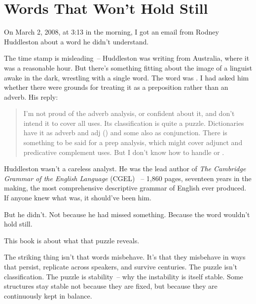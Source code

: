 % 

\chapter{Words That Won't Hold Still}
\label{ch:words-wont-hold-still}

\label{sec:1:opening}
On March 2, 2008, at 3:13 in the morning, I got an email from Rodney Huddleston about a word he didn't understand.

The time stamp is misleading~-- Huddleston was writing from Australia, where it was a reasonable hour. But there's something fitting about the image of a linguist awake in the dark, wrestling with a single word. The word was . I had asked him whether there were grounds for treating it as a preposition rather than an adverb. His reply:

\begin{quote}
I'm not proud of the adverb analysis, or confident about it, and don't intend it to cover all uses. Its classification is quite a puzzle. Dictionaries have it as adverb and adj () and some also as conjunction. There is something to be said for a prep analysis, which might cover adjunct and predicative complement uses. But I don't know how to handle  or .
\end{quote}

Huddleston wasn't a careless analyst. He was the lead author of \textit{The Cambridge Grammar of the English Language} (CGEL) \citep{huddleston2002}~-- 1,860 pages, seventeen years in the making, the most comprehensive descriptive grammar of English ever produced. If anyone knew what  was, it should've been him.

But he didn't. Not because he had missed something. Because the word wouldn't hold still.

This book is about what that puzzle reveals.

The striking thing isn't that words misbehave. It's that they misbehave in ways that persist, replicate across speakers, and survive centuries. The puzzle isn't classification. The puzzle is stability~-- why the instability is itself stable. Some structures stay stable not because they are fixed, but because they are continuously kept in balance.


